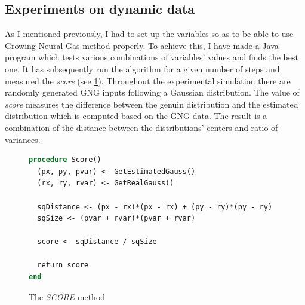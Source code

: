 \subsection{Experiments on dynamic data}

As I mentioned previously, I had to set-up the variables so as to be able to use Growing Neural Gas method properly. To achieve this, I have made a Java program which tests various combinations of variables' values and finds the best one. It has subsequently run the algorithm for a given number of steps and measured the \emph{score} (see \ref{usedalgo:scoremethod}). Throughout the experimental simulation there are randomly generated GNG inputs following a Gaussian distribution. The value of \emph{score} measures the difference between the genuin distribution and the estimated distribution which is computed based on the GNG data. The result is a combination of the distance between the distributions' centers and ratio of variances.

\begin{figure}
\begin{lstlisting}[language=Pascal]
procedure Score()
  (px, py, pvar) <- GetEstimatedGauss()
  (rx, ry, rvar) <- GetRealGauss()
  
  sqDistance <- (px - rx)*(px - rx) + (py - ry)*(py - ry)
  sqSize <- (pvar + rvar)*(pvar + rvar)
  
  score <- sqDistance / sqSize
  
  return score
end
\end{lstlisting}       
\caption{The \emph{SCORE} method}
\label{usedalgo:scoremethod}
\end{figure}
       
